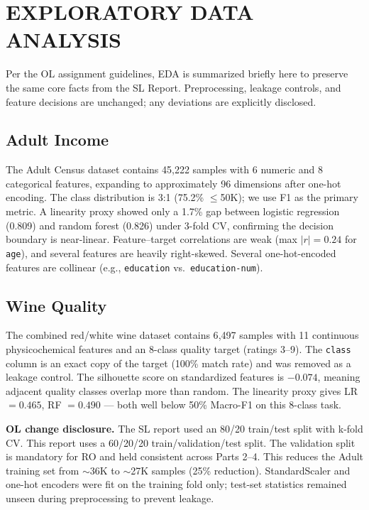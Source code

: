 \documentclass[letterpaper, 10 pt, conference]{ieeeconf}
\begin{document}
\section{EXPLORATORY DATA ANALYSIS}

Per the OL assignment guidelines, EDA is summarized briefly here to preserve the same core facts from the SL Report. Preprocessing, leakage controls, and feature decisions are unchanged; any deviations are explicitly disclosed.

\subsection{Adult Income}

The Adult Census dataset contains 45{,}222 samples with 6 numeric and 8 categorical features, expanding to approximately 96 dimensions after one-hot encoding. The class distribution is 3:1 (75.2\% $\leq$50K); we use F1 as the primary metric. A linearity proxy showed only a 1.7\% gap between logistic regression (0.809) and random forest (0.826) under 3-fold CV, confirming the decision boundary is near-linear. Feature--target correlations are weak (max $|r| = 0.24$ for \texttt{age}), and several features are heavily right-skewed. Several one-hot-encoded features are collinear (e.g., \texttt{education} vs.\ \texttt{education-num}).

\subsection{Wine Quality}

The combined red/white wine dataset contains 6{,}497 samples with 11 continuous physicochemical features and an 8-class quality target (ratings 3--9). The \texttt{class} column is an exact copy of the target (100\% match rate) and was removed as a leakage control. The silhouette score on standardized features is $-0.074$, meaning adjacent quality classes overlap more than random. The linearity proxy gives LR $= 0.465$, RF $= 0.490$ --- both well below 50\% Macro-F1 on this 8-class task.

\textbf{OL change disclosure.} The SL report used an 80/20 train/test split with k-fold CV. This report uses a 60/20/20 train/validation/test split. The validation split is mandatory for RO and held consistent across Parts 2--4. This reduces the Adult training set from $\sim$36K to $\sim$27K samples (25\% reduction). StandardScaler and one-hot encoders were fit on the training fold only; test-set statistics remained unseen during preprocessing to prevent leakage.
\end{document}
